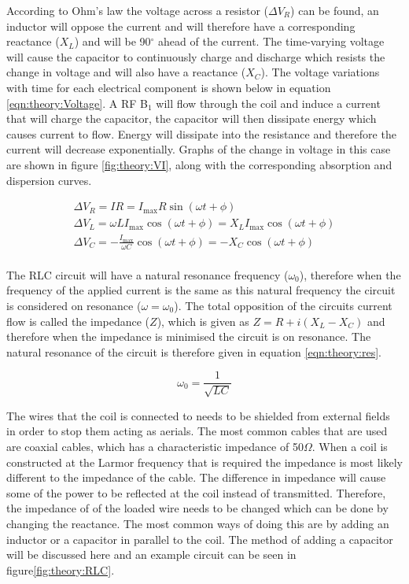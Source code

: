 \documentclass[class=article, crop=false]{standalone}
\begin{document}
According to Ohm's law the voltage across a resistor ($\Delta V_R$) can be found, an inductor will oppose the current and will therefore have a corresponding reactance ($X_L$) and will be 90$^\circ$ ahead of the current. The time-varying voltage will cause the capacitor to continuously charge and discharge which resists the change in voltage and will also have a reactance ($X_C$). The voltage variations with time for each electrical component is shown below in equation \ref{eqn:theory:Voltage}. A RF B$_1$ will flow through the coil and induce a current that will charge the capacitor, the capacitor will then dissipate energy which causes current to flow. Energy will dissipate into the resistance and therefore the current will decrease exponentially. Graphs of the change in voltage in this case are shown in figure \ref{fig:theory:VI}, along with the corresponding absorption and dispersion curves.  

\begin{equation}
\begin{gathered}
    \Delta V_R = IR = I_{\mathrm{max}}R\sin(\omega t + \phi) \\
    \Delta V_L = \omega LI_{\mathrm{max}}\cos(\omega t + \phi) =  X_LI_{\mathrm{max}}\cos(\omega t + \phi)\\
    \Delta V_C = -\frac{I_{\mathrm{max}}}{\omega C}\cos(\omega t + \phi) = -X_C\cos(\omega t + \phi)\\
    \label{eqn:theory:Voltage}
\end{gathered}
\end{equation}

The RLC circuit will have a natural resonance frequency ($\omega_0$), therefore when the frequency of the applied current is the same as this natural frequency the circuit is considered on resonance ($\omega=\omega_0$). The total opposition of the circuits current flow is called the impedance ($Z$), which is given as $Z = R+i(X_L-X_C)$ and therefore when the impedance is minimised the circuit is on resonance\cite{deGraaf2019InSpectroscopy}. The natural resonance of the circuit is therefore given in equation \ref{eqn:theory:res}.

\begin{equation}
    \omega_0 = \frac{1}{\sqrt{LC}}
    \label{eqn:theory:res}
\end{equation}

The wires that the coil is connected to needs to be shielded from external fields in order to stop them acting as aerials. The most common cables that are used are coaxial cables, which has a characteristic impedance of 50$\Omega$. When a coil is constructed at the Larmor frequency that is required the impedance is most likely different to the impedance of the cable. The difference in impedance will cause some of the power to be reflected at the coil instead of transmitted. Therefore, the impedance of of the loaded wire needs to be changed which can be done by changing the reactance. The most common ways of doing this are by adding an inductor or a capacitor in parallel to the coil. The method of adding a capacitor will be discussed here and an example circuit can be seen in figure\ref{fig:theory:RLC}.
\end{document}
